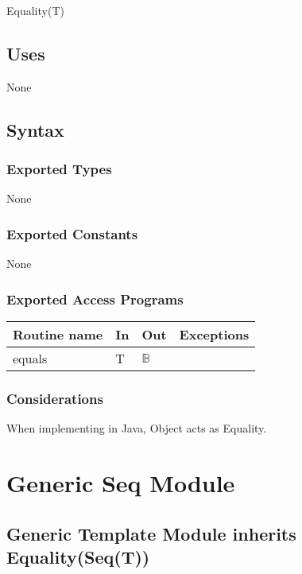 \documentclass[12pt]{article}
\begin{document}
Equality(T)

\subsection* {Uses}

None

\subsection* {Syntax}

\subsubsection* {Exported Types}

None

\subsubsection* {Exported Constants}

None

\subsubsection* {Exported Access Programs}

\begin{tabular}{| l | l | l | p{5cm} |}
	\hline
	\textbf{Routine name} & \textbf{In} & \textbf{Out} & \textbf{Exceptions}\\
	\hline
	equals & T & $\mathbb{B}$ & ~\\
	\hline
\end{tabular}

\subsubsection* {Considerations}

When implementing in Java, Object acts as Equality.


\newpage

\section* {Generic Seq Module}

\subsection* {Generic Template Module inherits Equality(Seq(T))}
\end{document}
